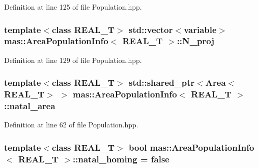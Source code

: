 Definition at line 125 of file Population.\-hpp.

\hypertarget{structmas_1_1_area_population_info_a52e46740a74a71eb75083b35b1e8cd53}{
\subsubsection[{N\-\_\-proj}]{\setlength{\rightskip}{0pt plus 5cm}template$<$class R\-E\-A\-L\-\_\-\-T$>$ std\-::vector$<${\bf variable}$>$ {\bf mas\-::\-Area\-Population\-Info}$<$ R\-E\-A\-L\-\_\-\-T $>$\-::N\-\_\-proj}}\label{structmas_1_1_area_population_info_a52e46740a74a71eb75083b35b1e8cd53}


Definition at line 129 of file Population.\-hpp.

\hypertarget{structmas_1_1_area_population_info_a04927ec6ccc6dd7ef32b795c9511f268}{
\subsubsection[{natal\-\_\-area}]{\setlength{\rightskip}{0pt plus 5cm}template$<$class R\-E\-A\-L\-\_\-\-T$>$ std\-::shared\-\_\-ptr$<${\bf Area}$<$R\-E\-A\-L\-\_\-\-T$>$ $>$ {\bf mas\-::\-Area\-Population\-Info}$<$ R\-E\-A\-L\-\_\-\-T $>$\-::natal\-\_\-area}}\label{structmas_1_1_area_population_info_a04927ec6ccc6dd7ef32b795c9511f268}


Definition at line 62 of file Population.\-hpp.

\hypertarget{structmas_1_1_area_population_info_a9127961ba1b99fbf6f55a00d05eadff4}{
\subsubsection[{natal\-\_\-homing}]{\setlength{\rightskip}{0pt plus 5cm}template$<$class R\-E\-A\-L\-\_\-\-T$>$ bool {\bf mas\-::\-Area\-Population\-Info}$<$ R\-E\-A\-L\-\_\-\-T $>$\-::natal\-\_\-homing = false}}\label{structmas_1_1_area_population_info_a9127961ba1b99fbf6f55a00d05eadff4}


